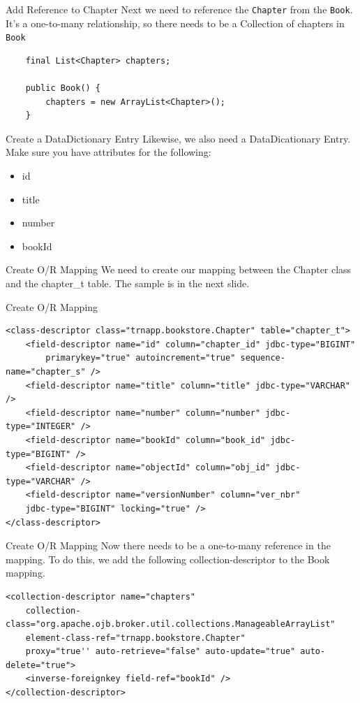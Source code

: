 \documentclass[xcolor=dvipsnames,14pt,professionalfonts]{beamer}
\begin{document}
 \begin{frame}[fragile]{Add Reference to Chapter}
   Next we need to reference the \texttt{Chapter} from the
   \texttt{Book}. It's a one-to-many relationship, so there needs to
   be a Collection of chapters in \texttt{Book}
 \begin{verbatim}
    final List<Chapter> chapters;
    
    public Book() {
        chapters = new ArrayList<Chapter>();
    }
    \end{verbatim}
\end{frame}
   

 \begin{frame}{Create a DataDictionary Entry}
   Likewise, we also need a DataDicationary Entry. Make sure you have
   attributes for the following:
   \begin{itemize}
     \item id
     \item title
     \item number
     \item bookId
   \end{itemize}
 \end{frame}

 \begin{frame}{Create O/R Mapping}
   We need to create our mapping between the Chapter class and the
   chapter_t table. The sample is in the next slide.
 \end{frame}

 \begin{frame}[fragile]{Create O/R Mapping}
 \begin{verbatim}
<class-descriptor class="trnapp.bookstore.Chapter" table="chapter_t">
    <field-descriptor name="id" column="chapter_id" jdbc-type="BIGINT" 
        primarykey="true" autoincrement="true" sequence-name="chapter_s" />
    <field-descriptor name="title" column="title" jdbc-type="VARCHAR" />
    <field-descriptor name="number" column="number" jdbc-type="INTEGER" />
    <field-descriptor name="bookId" column="book_id" jdbc-type="BIGINT" />
    <field-descriptor name="objectId" column="obj_id" jdbc-type="VARCHAR" />
    <field-descriptor name="versionNumber" column="ver_nbr" 
    jdbc-type="BIGINT" locking="true" />
</class-descriptor>
    \end{verbatim}
\end{frame}

 \begin{frame}[fragile]{Create O/R Mapping}
Now there needs to be a one-to-many reference in the mapping. To do
this, we add the following collection-descriptor to the Book mapping.
 \begin{verbatim}
<collection-descriptor name="chapters" 
    collection-class="org.apache.ojb.broker.util.collections.ManageableArrayList"
    element-class-ref="trnapp.bookstore.Chapter"
    proxy="true'' auto-retrieve="false" auto-update="true" auto-delete="true">
    <inverse-foreignkey field-ref="bookId" />
</collection-descriptor>
    \end{verbatim}
\end{frame}
\end{document}
